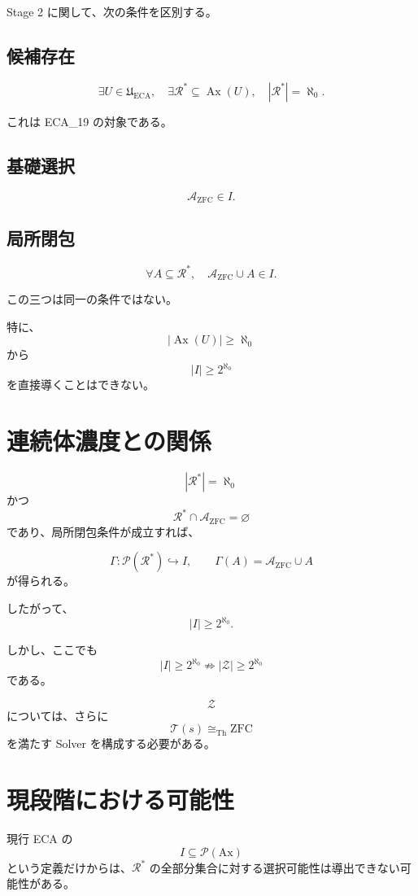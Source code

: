 \documentclass[a4paper,11pt]{article}
\newcommand{\Ax}{\mathrm{Ax}}
\begin{document}
Stage 2 に関して、次の条件を区別する。

\subsection*{候補存在}
\[
\exists U\in\mathfrak U_{\mathrm{ECA}},
\quad
\exists\mathcal{R}^*
\subseteq\operatorname{Ax}(U),
\quad
|\mathcal{R}^*|=\aleph_0.
\]

これは ECA_19 の対象である。

\subsection*{基礎選択}
\[
\mathcal{A}_{\mathrm{ZFC}}\in I.
\]

\subsection*{局所閉包}
\[
\forall A\subseteq\mathcal{R}^*,
\quad
\mathcal{A}_{\mathrm{ZFC}}\cup A\in I.
\]

この三つは同一の条件ではない。

特に、
\[
|\operatorname{Ax}(U)|\ge\aleph_0
\]
から
\[
|I|\ge2^{\aleph_0}
\]
を直接導くことはできない。

\section{連続体濃度との関係}

\[
|\mathcal{R}^*|=\aleph_0
\]
かつ
\[
\mathcal{R}^*\cap\mathcal{A}_{\mathrm{ZFC}}=\varnothing
\]
であり、局所閉包条件が成立すれば、

\[
\Gamma:
\mathcal{P}(\mathcal{R}^*)\hookrightarrow I,
\qquad
\Gamma(A)=\mathcal{A}_{\mathrm{ZFC}}\cup A
\]
が得られる。

したがって、
\[
|I|\ge2^{\aleph_0}.
\]

しかし、ここでも
\[
|I|\ge2^{\aleph_0}
\not\Rightarrow
|\mathcal{Z}|\ge2^{\aleph_0}
\]
である。

\[
\mathcal{Z}
\]
については、さらに
\[
\mathcal{T}(s)\cong_{\mathrm{Th}}\mathrm{ZFC}
\]
を満たす Solver を構成する必要がある。

\section{現段階における可能性}

現行 ECA の
\[
I\subseteq\mathcal{P}(\Ax)
\]
という定義だけからは、$\mathcal{R}^*$ の全部分集合に対する選択可能性は導出できない可能性がある。
\end{document}
